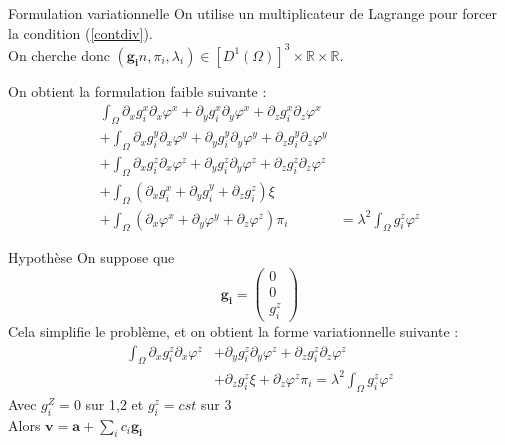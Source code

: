 \documentclass{beamer}
\begin{document}
\begin{frame}{Formulation variationnelle}
On utilise un multiplicateur de Lagrange pour forcer la condition (\ref{contdiv}).\\
On cherche donc $(\bm{g_i}n, \pi_i, \lambda_i)\in [D^1(\Omega)]^3 \times \mathbb{R} \times \mathbb{R}$.
\begin{block}{On obtient la formulation faible suivante :}
\begin{align*}
\int_\Omega \partial_xg_i^x\partial_x\varphi^x + \partial_yg_i^x\partial_y\varphi^x + \partial_zg_i^x\partial_z\varphi^x&\\
+\int_\Omega \partial_xg_i^y\partial_x\varphi^y + \partial_yg_i^y\partial_y\varphi^y + \partial_zg_i^y\partial_z\varphi^y&\\
+\int_\Omega \partial_xg_i^z\partial_x\varphi^z + \partial_yg_i^z\partial_y\varphi^z + \partial_zg_i^z\partial_z\varphi^z&\\
+\int_\Omega (\partial_x g_i^x+ \partial_y g_i^y + \partial_z g_i^z)\xi&\\
+\int_\Omega (\partial_x\varphi^x + \partial_y\varphi^y + \partial_z\varphi^z)\pi_i &= \lambda^2\int_\Omega g_i^z\varphi^z
\end{align*}
\end{block}
\end{frame}

\begin{frame}{Hypothèse}
On suppose que
\[
\bm{g_i} = \begin{pmatrix}0\\0\\g_i^z\end{pmatrix}
\]
Cela simplifie le problème, et on obtient la forme variationnelle suivante :
\begin{align*}
\int_\Omega \partial_xg_i^z\partial_x\varphi^z &+ \partial_yg_i^z\partial_y\varphi^z + \partial_zg_i^z\partial_z\varphi^z\\
&+ \partial_z g_i^z\xi + \partial_z\varphi^z\pi_i = \lambda^2\int_\Omega g_i^z\varphi^z
\end{align*}
Avec $g_i^Z=0$ sur 1,2 et $g_i^z=cst$ sur 3\\
Alors $\bm{v}=\bm{a}+\sum_i c_i\bm{g_i}$
\end{frame}
\end{document}
